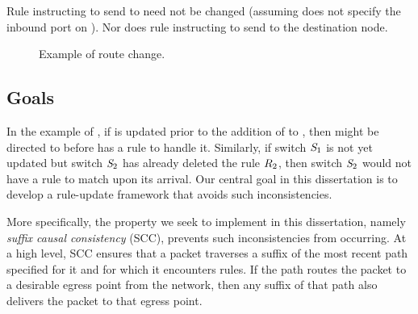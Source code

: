 Rule  instructing  to send \pktID{} to
 need not be changed (assuming 
does not specify the inbound port on ).  Nor does rule
 instructing  to send \pktID{} to the
destination node.

\begin{figure}
\centering
\resizebox{0.75\linewidth}{!}{\small}
\caption{Example of route change.}
\label{fig:route}
\vspace{-0.5cm}
\end{figure}

\subsection{Goals}
\label{sec:model:scc}

In the example of , if  is updated prior
to the addition of  to , then \pktID{} might be
directed to  before  has a rule to handle it.
Similarly, if switch $\switchID{1}$ is not yet updated but switch
$\switchID{2}$ has already deleted the rule $\ruleID{2}$, then switch
$\switchID{2}$ would not have a rule to match \pktID{} upon its
arrival.  Our central goal in this dissertation is to develop a rule-update
framework that avoids such inconsistencies.

More specifically, the property we seek to implement in this dissertation,
namely \textit{suffix causal consistency} (SCC), prevents such
inconsistencies from occurring.  At a high level, SCC ensures that a
packet traverses a suffix of the most recent path specified for it and
for which it encounters rules.  If the path routes the packet to a
desirable egress point from the network, then any suffix of that path
also delivers the packet to that egress point.

\medskip

\hspace*{-\parindent}


